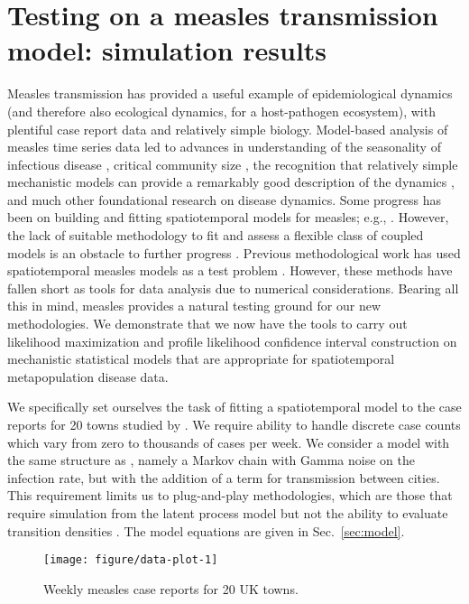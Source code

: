 \documentclass[12pt]{article}\usepackage[]{graphicx}\usepackage[]{xcolor}
\newenvironment{knitrout}{}{} %
\begin{document}
\section{Testing {\ibpf} on a measles transmission model: simulation results}
\label{sec:sim}

Measles transmission has provided a useful example of epidemiological dynamics (and therefore also ecological dynamics, for a host-pathogen ecosystem), with plentiful case report data and relatively simple biology.
Model-based analysis of measles time series data led to advances in understanding of the seasonality of infectious disease \citep{fine82}, critical community size \citep{bartlett57}, the recognition that relatively simple mechanistic models can provide a remarkably good description of the dynamics \citep{earn00}, and much other foundational research on disease dynamics.
Some progress has been on building and fitting spatiotemporal models for measles; e.g., \citet{xia04,eggo11,bjornstad19,becker20}.
However, the lack of suitable methodology to fit and assess a flexible class of coupled models is an obstacle to further progress \citep{becker20}.
Previous methodological work has used spatiotemporal measles models as a test problem \citep{park20,ionides21}.
However, these methods have fallen short as tools for data analysis due to numerical considerations.
Bearing all this in mind, measles provides a natural testing ground for our new methodologies.
We demonstrate that we now have the tools to carry out likelihood maximization and profile likelihood confidence interval construction on mechanistic statistical models that are appropriate for spatiotemporal metapopulation disease data.

We specifically set ourselves the task of fitting a spatiotemporal model to the case reports for 20 towns studied by \citet{he10}.
We require ability to handle discrete case counts which vary from zero to thousands of cases per week.
We consider a model with the same structure as \citet{he10}, namely a Markov chain with Gamma noise on the infection rate, but with the addition of a term for transmission between cities.
This requirement limits us to plug-and-play methodologies, which are those that require simulation from the latent process model but not the ability to  evaluate transition densities \citep{breto09,he10}.
The model equations are given in Sec.~\ref{sec:model}.

\begin{knitrout}
\color{fgcolor}\begin{figure}

\texttt{[image: figure/data-plot-1]} \hfill{}

\caption[Weekly measles case reports for 20 UK towns]{Weekly measles case reports for 20 UK towns.}\label{fig:data-plot}
\end{figure}

\end{knitrout}
\end{document}
